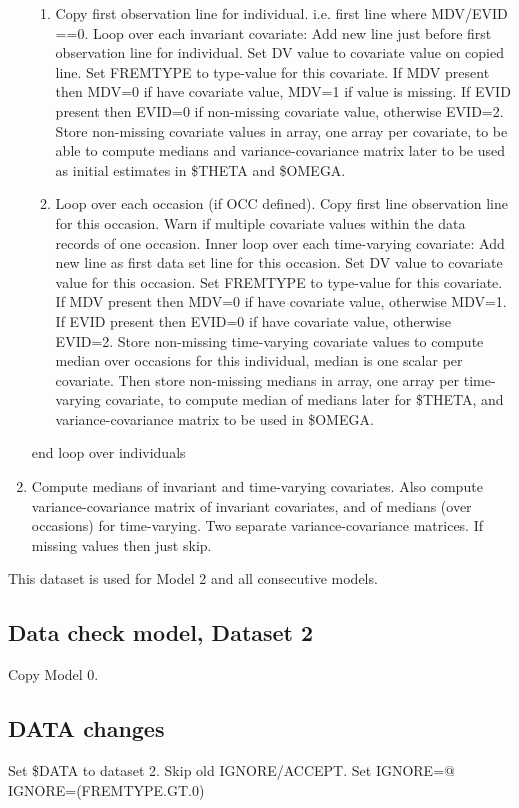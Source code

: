 \documentclass[a4paper,12pt]{article}
\begin{document}
\begin{enumerate}
\begin{enumerate}
	\item Copy first observation line for individual. i.e. first line where MDV/EVID ==0. Loop over each invariant covariate: Add new line just before first observation line for individual. Set DV value to covariate value on copied line. Set FREMTYPE to type-value for this covariate. If MDV present then MDV=0 if have covariate value, MDV=1 if value is missing. If EVID present then EVID=0 if non-missing covariate value, otherwise EVID=2. Store non-missing covariate values in array, one array per covariate, to be able to compute medians and variance-covariance matrix later to be used as initial estimates in \$THETA and \$OMEGA. 
	\item Loop over each occasion (if OCC defined). Copy first line observation line for this occasion. Warn if multiple  covariate values within the data records of one occasion. Inner loop over each time-varying covariate: Add new line as first data set line for this occasion. Set DV value to covariate value for this occasion. Set FREMTYPE to type-value for this covariate. If MDV present then MDV=0 if have covariate value, otherwise MDV=1. If EVID present then EVID=0 if have covariate value, otherwise EVID=2. Store non-missing time-varying covariate values to compute median over occasions for this individual, median is one scalar per covariate. Then store non-missing medians in array, one array per time-varying covariate, to compute median of medians later for \$THETA, and variance-covariance matrix  to be used in \$OMEGA.
\end{enumerate}
end loop over individuals
	\item Compute medians of invariant and time-varying covariates. Also compute variance-covariance matrix of invariant covariates, and of medians (over occasions) for time-varying. Two separate variance-covariance matrices. If missing values then just skip.
\end{enumerate}

This dataset is used for Model 2 and all consecutive models.

\subsection{Data check model, Dataset 2}
Copy Model 0.

\subsection{DATA changes}
Set \$DATA to dataset 2. Skip old IGNORE/ACCEPT. Set IGNORE=@ IGNORE=(FREMTYPE.GT.0)
\end{document}
